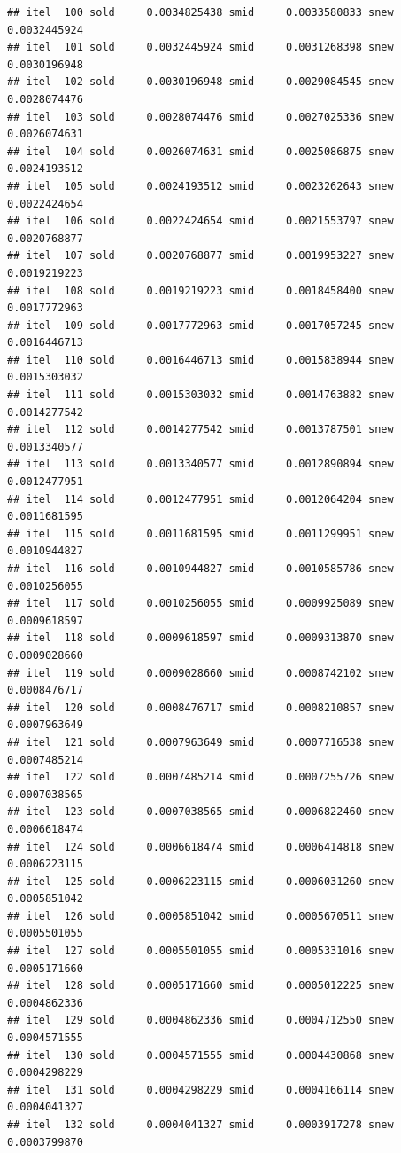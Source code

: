 \documentclass[
  12pt,
]{article}
\begin{document}
\begin{verbatim}
## itel  100 sold     0.0034825438 smid     0.0033580833 snew     0.0032445924 
## itel  101 sold     0.0032445924 smid     0.0031268398 snew     0.0030196948 
## itel  102 sold     0.0030196948 smid     0.0029084545 snew     0.0028074476 
## itel  103 sold     0.0028074476 smid     0.0027025336 snew     0.0026074631 
## itel  104 sold     0.0026074631 smid     0.0025086875 snew     0.0024193512 
## itel  105 sold     0.0024193512 smid     0.0023262643 snew     0.0022424654 
## itel  106 sold     0.0022424654 smid     0.0021553797 snew     0.0020768877 
## itel  107 sold     0.0020768877 smid     0.0019953227 snew     0.0019219223 
## itel  108 sold     0.0019219223 smid     0.0018458400 snew     0.0017772963 
## itel  109 sold     0.0017772963 smid     0.0017057245 snew     0.0016446713 
## itel  110 sold     0.0016446713 smid     0.0015838944 snew     0.0015303032 
## itel  111 sold     0.0015303032 smid     0.0014763882 snew     0.0014277542 
## itel  112 sold     0.0014277542 smid     0.0013787501 snew     0.0013340577 
## itel  113 sold     0.0013340577 smid     0.0012890894 snew     0.0012477951 
## itel  114 sold     0.0012477951 smid     0.0012064204 snew     0.0011681595 
## itel  115 sold     0.0011681595 smid     0.0011299951 snew     0.0010944827 
## itel  116 sold     0.0010944827 smid     0.0010585786 snew     0.0010256055 
## itel  117 sold     0.0010256055 smid     0.0009925089 snew     0.0009618597 
## itel  118 sold     0.0009618597 smid     0.0009313870 snew     0.0009028660 
## itel  119 sold     0.0009028660 smid     0.0008742102 snew     0.0008476717 
## itel  120 sold     0.0008476717 smid     0.0008210857 snew     0.0007963649 
## itel  121 sold     0.0007963649 smid     0.0007716538 snew     0.0007485214 
## itel  122 sold     0.0007485214 smid     0.0007255726 snew     0.0007038565 
## itel  123 sold     0.0007038565 smid     0.0006822460 snew     0.0006618474 
## itel  124 sold     0.0006618474 smid     0.0006414818 snew     0.0006223115 
## itel  125 sold     0.0006223115 smid     0.0006031260 snew     0.0005851042 
## itel  126 sold     0.0005851042 smid     0.0005670511 snew     0.0005501055 
## itel  127 sold     0.0005501055 smid     0.0005331016 snew     0.0005171660 
## itel  128 sold     0.0005171660 smid     0.0005012225 snew     0.0004862336 
## itel  129 sold     0.0004862336 smid     0.0004712550 snew     0.0004571555 
## itel  130 sold     0.0004571555 smid     0.0004430868 snew     0.0004298229 
## itel  131 sold     0.0004298229 smid     0.0004166114 snew     0.0004041327 
## itel  132 sold     0.0004041327 smid     0.0003917278 snew     0.0003799870 

\end{verbatim}
\end{document}
